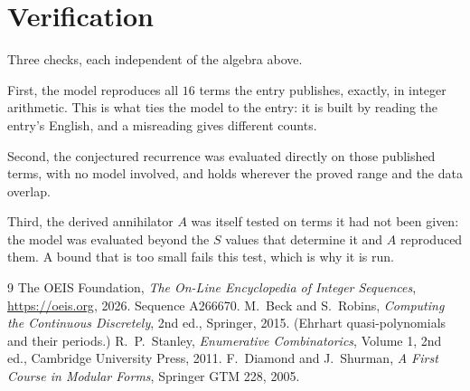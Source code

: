 \documentclass[11pt,a4paper]{article}
\theoremstyle{plain}
\theoremstyle{definition}
\begin{document}
\section{Verification}

Three checks, each independent of the algebra above.

First, the model reproduces all $16$ terms the entry publishes, exactly, in integer
arithmetic. This is what ties the model to the entry: it is built by reading the entry's
English, and a misreading gives different counts.

Second, the conjectured recurrence was evaluated directly on those published terms, with no
model involved, and holds wherever the proved range and the data overlap.

Third, the derived annihilator $A$ was itself tested on terms it had not been given: the model
was evaluated beyond the $S$ values that determine it and $A$ reproduced them. A bound that is
too small fails this test, which is why it is run.

\begin{thebibliography}{9}
 The OEIS Foundation, \emph{The On-Line Encyclopedia of Integer
Sequences}, \url{https://oeis.org}, 2026. Sequence A266670.
 M.~Beck and S.~Robins, \emph{Computing the Continuous Discretely},
2nd ed., Springer, 2015. (Ehrhart quasi-polynomials and their periods.)
 R.~P.~Stanley, \emph{Enumerative Combinatorics}, Volume 1, 2nd ed.,
Cambridge University Press, 2011.
 F.~Diamond and J.~Shurman, \emph{A First Course in Modular Forms},
Springer GTM 228, 2005.
\end{thebibliography}
\end{document}
